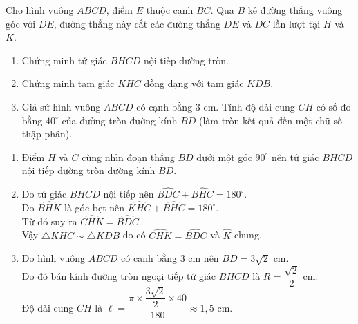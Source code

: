 \begin{ex}%
    Cho hình vuông $ABCD$, điểm $E$ thuộc cạnh $BC$. Qua $B$ kẻ đường thẳng vuông góc với $DE$, đường thẳng này cắt các đường thẳng $DE$ và $DC$ lần lượt tại $H$ và $K$.
    \begin{enumerate}
        \item Chứng minh tứ giác $BHCD$ nội tiếp đường tròn.
        \item Chứng minh tam giác $KHC$ đồng dạng với tam giác $KDB$.
        \item Giả sử hình vuông $ABCD$ có cạnh bằng $3$ cm. Tính độ dài cung $CH$ có số đo bằng $40^\circ$ của đường tròn đường kính $BD$ (làm tròn kết quả đến một chữ số thập phân).
    \end{enumerate}
\loigiai
    {
\begin{center}
\end{center}
    \begin{enumerate}
        \item Điểm $H$ và $C$ cùng nhìn đoạn thẳng $BD$ dưới một góc $90^\circ$ nên tứ giác $BHCD$ nội tiếp đường tròn đường kính $BD$.
        \item Do tứ giác $BHCD$ nội tiếp nên $\widehat{BDC}+\widehat{BHC}=180^\circ$.\\Do $\widehat{BHK}$ là góc bẹt nên $\widehat{KHC}+\widehat{BHC}=180^\circ$.\\Từ đó suy ra $\widehat{CHK}=\widehat{BDC}$.\\Vậy $\triangle KHC\sim \triangle KDB$ do có $\widehat{CHK}=\widehat{BDC}$ và $\widehat{K}$ chung.
        \item Do hình vuông $ABCD$ có cạnh bằng $3$ cm nên $BD=3\sqrt{2}$ cm.\\Do đó bán kính đường tròn ngoại tiếp tứ giác $BHCD$ là $R=\dfrac{\sqrt{2}}{2}$ cm.\\Độ dài cung $CH$ là $\ell=\dfrac{\pi\times\dfrac{3\sqrt{2}}{2}\times 40}{180}\approx 1,5$ cm.
    \end{enumerate}
    }
\end{ex}

